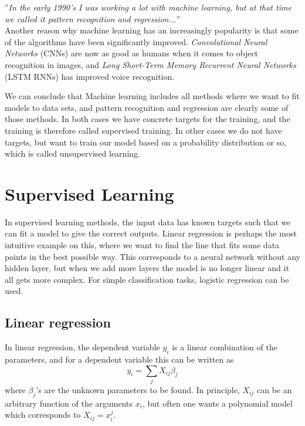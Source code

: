 ''\textit{In the early 1990's I was working a lot with machine learning, but at that time we called it pattern recognition and regression...}''\\

Another reason why machine learning has an increasingly popularity is that some of the algorithms have been significantly improved. \textit{Convolutional Neural Networks} (CNNs) are now as good as humans when it comes to object recognition in images, and \textit{Long Short-Term Memory Recurrent Neural Networks} (LSTM RNNs) has improved voice recognition. 

We can conclude that Machine learning includes all methods where we want to fit models to data sets, and pattern recognition and regression are clearly some of those methods. In both cases we have concrete targets for the training, and the training is therefore called supervised training. In other cases we do not have targets, but want to train our model based on a probability distribution or so, which is called unsupervised learning.

\section{Supervised Learning}
In supervised learning methods, the input data has known targets such that we can fit a model to give the correct outputs. Linear regression is perhaps the most intuitive example on this, where we want to find the line that fits some data points in the best possible way. This corresponds to a neural network without any hidden layer, but when we add more layers the model is no longer linear and it all gets more complex. For simple classification tasks, logistic regression can be used. 

\subsection{Linear regression}
In linear regression, the dependent variable $y_i$ is a linear combination of the parameters, and for a dependent variable this can be written as
\begin{equation}
y_i=\sum_jX_{ij}\beta_j
\end{equation}
where $\beta_j$'s are the unknown parameters to be found. In principle, $X_{ij}$ can be an arbitrary function of the arguments $x_i$, but often one wants a polynomial model which corresponds to $X_{ij} = x_i^j$.


